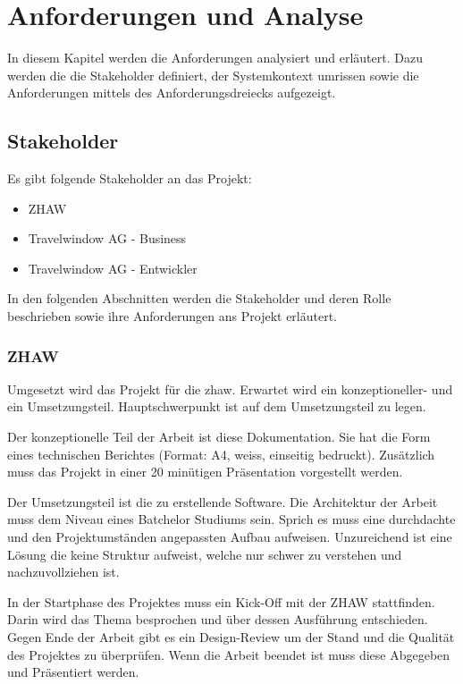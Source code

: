 

\chapter{Anforderungen und Analyse}
\label{sec:analyse}
In diesem Kapitel werden die Anforderungen analysiert und erläutert. Dazu werden die die Stakeholder definiert, der Systemkontext umrissen sowie die Anforderungen mittels des Anforderungsdreiecks aufgezeigt. 

\section{Stakeholder}
Es gibt folgende Stakeholder an das Projekt:
\begin{itemize}
\item ZHAW
\item Travelwindow AG - Business
\item Travelwindow AG - Entwickler
\end{itemize}

In den folgenden Abschnitten werden die Stakeholder und deren Rolle beschrieben sowie ihre Anforderungen ans Projekt erläutert.

\subsection{ZHAW}
Umgesetzt wird das Projekt für die \gls{zhaw}. Erwartet wird ein konzeptioneller- und ein Umsetzungsteil. Hauptschwerpunkt ist auf dem Umsetzungsteil zu legen.

Der konzeptionelle Teil der Arbeit ist diese Dokumentation. Sie hat die Form eines technischen Berichtes (Format: A4, weiss, einseitig bedruckt). Zusätzlich muss das Projekt in einer 20 minütigen Präsentation vorgestellt werden.

Der Umsetzungsteil ist die zu erstellende Software. Die Architektur der Arbeit muss dem Niveau eines Batchelor Studiums sein. Sprich es muss eine durchdachte und den Projektumständen angepassten Aufbau aufweisen. Unzureichend ist eine Lösung die keine Struktur aufweist, welche nur schwer zu verstehen und nachzuvollziehen ist.

In der Startphase des Projektes muss ein Kick-Off mit der ZHAW stattfinden. Darin wird das Thema besprochen und über dessen Ausführung entschieden. Gegen Ende der Arbeit gibt es ein Design-Review um der Stand und die Qualität des Projektes zu überprüfen. Wenn die Arbeit beendet ist muss diese Abgegeben und Präsentiert werden.

